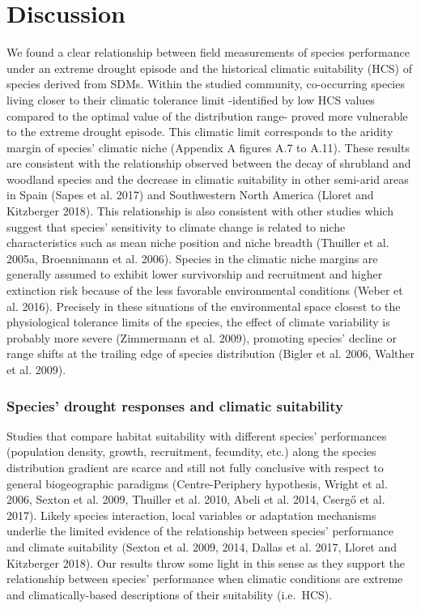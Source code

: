 \documentclass[11pt,twoside]{reedthesis}
\begin{document}
\section{Discussion}\label{discussion}

We found a clear relationship between field measurements of species
performance under an extreme drought episode and the historical climatic
suitability (HCS) of species derived from SDMs. Within the studied
community, co-occurring species living closer to their climatic
tolerance limit -identified by low HCS values compared to the optimal
value of the distribution range- proved more vulnerable to the extreme
drought episode. This climatic limit corresponds to the aridity margin
of species' climatic niche (Appendix A figures A.7 to A.11). These
results are consistent with the relationship observed between the decay
of shrubland and woodland species and the decrease in climatic
suitability in other semi-arid areas in Spain (Sapes et al. 2017) and
Southwestern North America (Lloret and Kitzberger 2018). This
relationship is also consistent with other studies which suggest that
species' sensitivity to climate change is related to niche
characteristics such as mean niche position and niche breadth (Thuiller
et al. 2005a, Broennimann et al. 2006). Species in the climatic niche
margins are generally assumed to exhibit lower survivorship and
recruitment and higher extinction risk because of the less favorable
environmental conditions (Weber et al. 2016). Precisely in these
situations of the environmental space closest to the physiological
tolerance limits of the species, the effect of climate variability is
probably more severe (Zimmermann et al. 2009), promoting species'
decline or range shifts at the trailing edge of species distribution
(Bigler et al. 2006, Walther et al. 2009).\par

\subsubsection{Species' drought responses and climatic
suitability}\label{species-drought-responses-and-climatic-suitability}

Studies that compare habitat suitability with different species'
performances (population density, growth, recruitment, fecundity, etc.)
along the species distribution gradient are scarce and still not fully
conclusive with respect to general biogeographic paradigms
(Centre-Periphery hypothesis, Wright et al. 2006, Sexton et al. 2009,
Thuiller et al. 2010, Abeli et al. 2014, Csergő et al. 2017). Likely
species interaction, local variables or adaptation mechanisms underlie
the limited evidence of the relationship between species' performance
and climate suitability (Sexton et al. 2009, 2014, Dallas et al. 2017,
Lloret and Kitzberger 2018). Our results throw some light in this sense
as they support the relationship between species' performance when
climatic conditions are extreme and climatically-based descriptions of
their suitability (i.e.~HCS).\par
\end{document}
